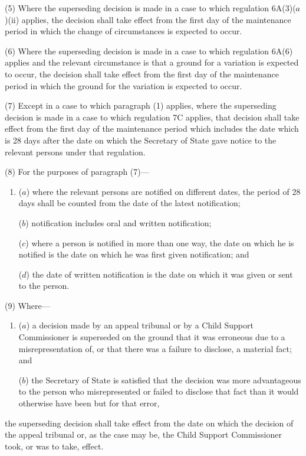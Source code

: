 \documentclass[12pt,a4paper]{article}
\begin{document}
{(5) Where the superseding decision is made in a case to which regulation 6A(3)($a$)(ii)  applies, the decision shall take effect from the first day of the maintenance period in which the change of circumstances is expected to occur.

(6) Where the superseding decision is made in a case to which regulation 6A(6) applies and the relevant circumstance is that a ground for a variation is expected to occur, the decision shall take effect from the first day of the maintenance period in which the ground for the variation is expected to occur.

(7) Except in a case to which paragraph (1) applies, where the superseding decision is made in a case to which regulation 7C applies, that decision shall take effect from the first day of the maintenance period which includes the date which is 28 days after the date on which the Secretary of State gave notice to the relevant persons under that regulation.

(8) For the purposes of paragraph (7)—
\begin{enumerate}\item[]
($a$) where the relevant persons are notified on different dates, the period of 28 days shall be counted from the date of the latest notification;

($b$) notification includes oral and written notification;

($c$) where a person is notified in more than one way, the date on which he is notified is the date on which he was first given notification; and

($d$) the date of written notification is the date on which it was given or sent to the person.
\end{enumerate}

(9) Where—
\begin{enumerate}\item[]
($a$) a decision made by an appeal tribunal or by a Child Support Commissioner is superseded on the ground that it was erroneous due to a misrepresentation of, or that there was a failure to disclose, a material fact; and

($b$) the Secretary of State is satisfied that the decision was more advantageous to the person who misrepresented or failed to disclose that fact than it would otherwise have been but for that error,
\end{enumerate}
the superseding decision shall take effect from the date on which the decision of the appeal tribunal or, as the case may be, the Child Support Commissioner took, or was to take, effect.

}
\end{document}
